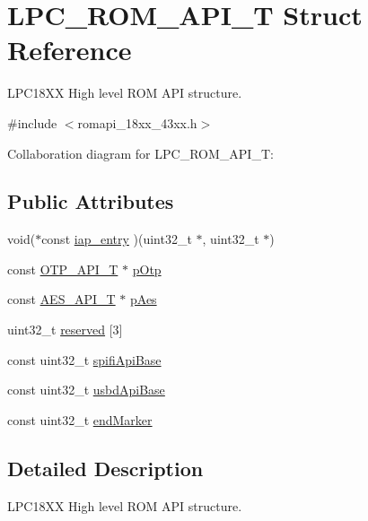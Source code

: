\hypertarget{struct_l_p_c___r_o_m___a_p_i___t}{}\section{L\+P\+C\+\_\+\+R\+O\+M\+\_\+\+A\+P\+I\+\_\+T Struct Reference}
\label{struct_l_p_c___r_o_m___a_p_i___t}


L\+P\+C18\+XX High level R\+OM A\+PI structure.  




{\ttfamily \#include $<$romapi\+\_\+18xx\+\_\+43xx.\+h$>$}



Collaboration diagram for L\+P\+C\+\_\+\+R\+O\+M\+\_\+\+A\+P\+I\+\_\+T\+:
\subsection*{Public Attributes}
\begin{DoxyCompactItemize}
\item 
void($\ast$const \hyperlink{struct_l_p_c___r_o_m___a_p_i___t_ab4e3fc4457ad9c1d44585bbeb5ac4c7d}{iap\+\_\+entry} )(uint32\+\_\+t $\ast$, uint32\+\_\+t $\ast$)
\item 
const \hyperlink{struct_o_t_p___a_p_i___t}{O\+T\+P\+\_\+\+A\+P\+I\+\_\+T} $\ast$ \hyperlink{struct_l_p_c___r_o_m___a_p_i___t_a471135c558880b77c29a47775cb44bd4}{p\+Otp}
\item 
const \hyperlink{struct_a_e_s___a_p_i___t}{A\+E\+S\+\_\+\+A\+P\+I\+\_\+T} $\ast$ \hyperlink{struct_l_p_c___r_o_m___a_p_i___t_a680d175a28398434faec95ca257a0884}{p\+Aes}
\item 
uint32\+\_\+t \hyperlink{struct_l_p_c___r_o_m___a_p_i___t_af595b72d7ab107c40c293c537e60ddd2}{reserved} \mbox{[}3\mbox{]}
\item 
const uint32\+\_\+t \hyperlink{struct_l_p_c___r_o_m___a_p_i___t_a80394f1400f6fb04175f5d7fe2aa9f14}{spifi\+Api\+Base}
\item 
const uint32\+\_\+t \hyperlink{struct_l_p_c___r_o_m___a_p_i___t_a94bc8146ba697eeadc992d4985971550}{usbd\+Api\+Base}
\item 
const uint32\+\_\+t \hyperlink{struct_l_p_c___r_o_m___a_p_i___t_acf7fbdd0e99ee19a0fb377cabaf4d59b}{end\+Marker}
\end{DoxyCompactItemize}


\subsection{Detailed Description}
L\+P\+C18\+XX High level R\+OM A\+PI structure. 

